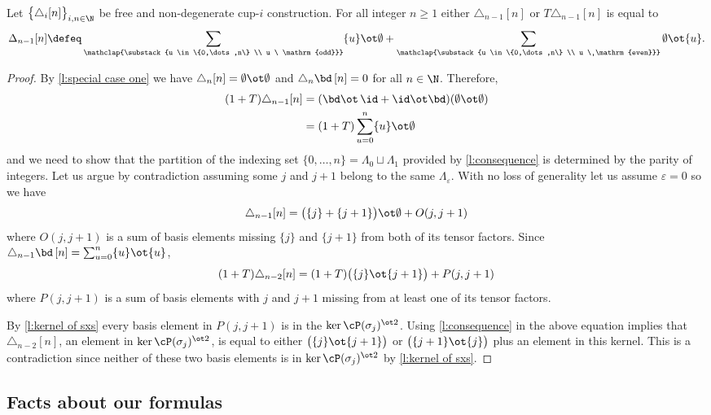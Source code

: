 \begin{lemma}\label{l:special case two}
	Let $\big\{ \triangle_i [n] \big\}_{i,n\in\N}$ be free and non-degenerate \mbox{cup-$i$} construction.
	For all integer $n \geq 1$ either $\triangle_{n-1} [n]$ or $T \triangle_{n-1} [n]$ is equal to
	\[
	\Delta_{n-1} [n] \defeq
	\sum_{\mathclap{\substack{u \in \{0,\dots,n\} \\ u \ \mathrm{odd}}}} \{u\} \ot \emptyset +
	\sum_{\mathclap{\substack{u \in \{0,\dots,n\} \\ u \ \mathrm{even}}}} \emptyset \ot \{u\}.
	\]
\end{lemma}

\begin{proof}
	By \cref{l:special case one} we have $\triangle_{n} [n] = \emptyset \ot \emptyset$ and $\triangle_{n} \bd \, [n] = 0$ for all $n \in \N$.
	Therefore,
	\begin{align*}
	(1+T) \triangle_{n-1} [n] &=
	(\bd \ot \, \id + \id \ot \bd) (\emptyset \ot \emptyset) \\ &=
	(1+T) \sum_{u=0}^n \{u\} \ot \emptyset
	\end{align*}
	and we need to show that the partition of the indexing set $\{0, \dots, n\} = \Lambda_0 \sqcup \Lambda_1$ provided by \cref{l:consequence} is determined by the parity of integers.
	Let us argue by contradiction assuming some $j$ and $j+1$ belong to the same $\Lambda_{\varepsilon}$.
	With no loss of generality let us assume $\varepsilon = 0$ so we have
	\[
	\triangle_{n-1} [n] = \big( \{j\} + \{j+1\} \big) \ot \emptyset + O(j, j+1)
	\]
	where $O(j, j+1)$ is a sum of basis elements missing $\{j\}$ and $\{j+1\}$ from both of its tensor factors.
	Since $\triangle_{n-1} \bd \, [n] = \sum_{u=0}^{n} \{u\} \ot \{u\}$,
	\[
	(1+T) \triangle_{n-2} [n] = (1+T) \big( \{j\} \ot \{j+1\} \big) + P(j, j+1)
	\]
	where $P(j, j+1)$ is a sum of basis elements with $j$ and $j+1$ missing from at least one of its tensor factors.

	By \cref{l:kernel of sxs} every basis element in $P(j,j+1)$ is in the $\ker \cP(\sigma_j)^{\ot 2}$.
	Using \cref{l:consequence} in the above equation implies that $\triangle_{n-2}[n]$, an element in $\ker \cP(\sigma_j)^{\ot 2}$, is equal to either $\big( \{j\} \ot \{j+1\} \big)$ or $\big( \{j+1\} \ot \{j\} \big)$ plus an element in this kernel.
	This is a contradiction since neither of these two basis elements is in $\ker \cP(\sigma_j)^{\ot 2}$ by \cref{l:kernel of sxs}.
\end{proof}

\subsection{Facts about our formulas}\label{ss:fact}

